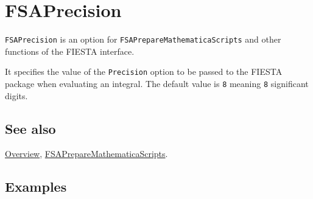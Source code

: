 \documentclass[../FeynHelpersManual.tex]{subfiles}
\begin{document}
\hypertarget{fsaprecision}{
\section{FSAPrecision}\label{fsaprecision}}

\texttt{FSAPrecision} is an option for
\texttt{FSAPrepareMathematicaScripts} and other functions of the FIESTA
interface.

It specifies the value of the \texttt{Precision} option to be passed to
the FIESTA package when evaluating an integral. The default value is
\texttt{8} meaning \texttt{8} significant digits.

\subsection{See also}

\hyperlink{toc}{Overview},
\hyperlink{fsapreparemathematicascripts}{FSAPrepareMathematicaScripts}.

\subsection{Examples}
\end{document}
